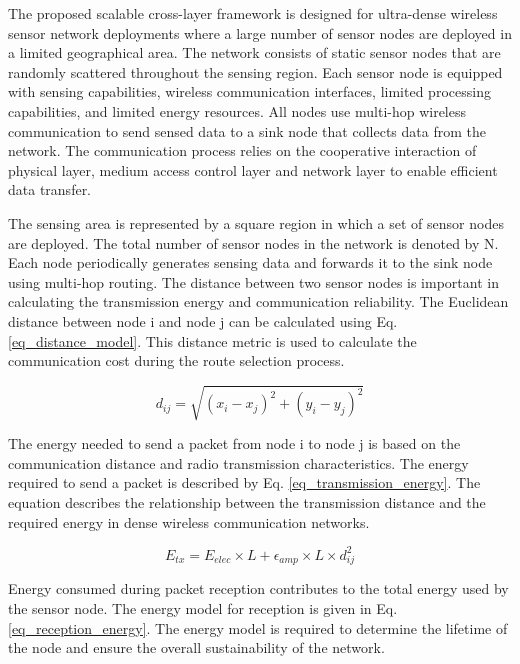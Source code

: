\documentclass[a4paper,fleqn]{cas-dc}
\numberwithin{equation}{section}
\begin{document}
The proposed scalable cross-layer framework is designed for ultra-dense wireless sensor network deployments where a large number of sensor nodes are deployed in a limited geographical area. The network consists of static sensor nodes that are randomly scattered throughout the sensing region. Each sensor node is equipped with sensing capabilities, wireless communication interfaces, limited processing capabilities, and limited energy resources. All nodes use multi-hop wireless communication to send sensed data to a sink node that collects data from the network. The communication process relies on the cooperative interaction of physical layer, medium access control layer and network layer to enable efficient data transfer.

The sensing area is represented by a square region in which a set of sensor nodes are deployed. The total number of sensor nodes in the network is denoted by N. Each node periodically generates sensing data and forwards it to the sink node using multi-hop routing. The distance between two sensor nodes is important in calculating the transmission energy and communication reliability. The Euclidean distance between node i and node j can be calculated using Eq. \ref{eq_distance_model}. This distance metric is used to calculate the communication cost during the route selection process.

\begin{equation}
d_{ij} = \sqrt{(x_i - x_j)^2 + (y_i - y_j)^2}
\label{eq_distance_model}
\end{equation}

The energy needed to send a packet from node i to node j is based on the communication distance and radio transmission characteristics. The energy required to send a packet is described by Eq. \ref{eq_transmission_energy}. The equation describes the relationship between the transmission distance and the required energy in dense wireless communication networks.

\begin{equation}
E_{tx} = E_{elec} \times L + \epsilon_{amp} \times L \times d_{ij}^2
\label{eq_transmission_energy}
\end{equation}

Energy consumed during packet reception contributes to the total energy used by the sensor node. The energy model for reception is given in Eq. \ref{eq_reception_energy}. The energy model is required to determine the lifetime of the node and ensure the overall sustainability of the network.
\end{document}
